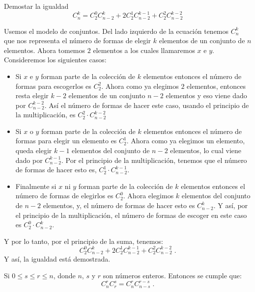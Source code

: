 \documentclass[12pt]{article}
\begin{document}
\begin{ejemplo}
   Demostar la igualdad
   \[C^k_n=C^0_2C^k_{n-2}+2C^1_2C^{k-1}_{n-2}+C^2_2C^{k-2}_{n-2}\]
\end{ejemplo}
\begin{solucion}
Usemos el modelo de conjuntos. Del lado izquierdo de la ecuación
tenemos $\displaystyle C^k_n$ que nos representa el número de formas de elegir $k$ elementos de un conjunto de $n$ elementos. Ahora tomemos $2$ elementos a los cuales llamaremos $x$ e $y$. Consideremos los siguientes casos:
\begin{itemize}
    \item Si $x$ e $y$ forman parte de la colección de $k$ elementos entonces el número de formas para escogerlos es $C^2_2$. Ahora como ya elegimos $2$ elementos, entonces resta elegir $k-2$ elementos de un conjunto $n-2$ elementos y eso viene dado por $\displaystyle C^{k-2}_{n-2}$. Así el número de formas de hacer este caso, usando el principio de la multiplicación, es $C^2_2 \cdot C^{k-2}_{n-2}$
    \item Si $x$ o $y$ forman parte de la colección de $k$ elementos entonces el número de formas para elegir un elemento es $\displaystyle C^1_2$. Ahora como ya elegimos un elemento, queda elegir $k-1$ elementos del conjunto de $n-2$ elementos, lo cual viene dado por $\displaystyle C^{k-1}_{n-2}$. Por el principio de la multiplicación, tenemos que el número de formas de hacer esto es, $C^1_2\cdot C^{k-1}_{n-2}$.
    \item  Finalmente si $x$ ni $y$ forman parte de la colección de $k$ elementos entonces el número de formas de elegirlos es $C^0_2$. Ahora elegimos $k$ elementos del conjunto de $n-2$ elementos, y, el número de formas de hacer esto es $C^k_{n-2}$. Y así, por el principio de la multiplicación, el número de formas de escoger en este caso es $C^0_2\cdot C^k_{n-2}$.
\end{itemize}
Y por lo tanto, por el principio de la suma, tenemos:
\[C^0_2C^k_{n-2}+2C^1_2C^{k-1}_{n-2}+C^2_2C^{k-2}_{n-2}\;.\]
Y así, la igualdad está demostrada.
\end{solucion}
\begin{ejemplo}
Si $0\leq s\leq r \leq n$, donde $n$, $s$ y $r$ son números enteros. Entonces se cumple que:
\[C^r_nC^s_r=C^r_nC^{r-s}_{n-s}\;.\]
\end{ejemplo}
\end{document}
